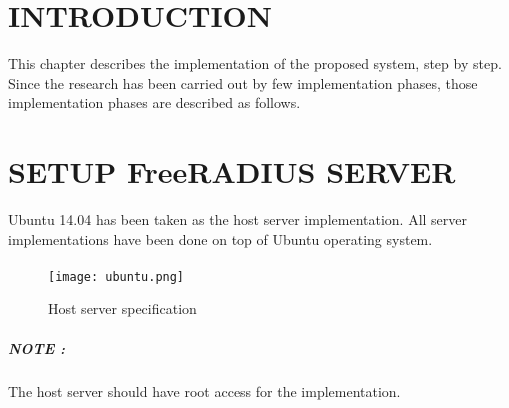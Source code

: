 \section{INTRODUCTION}
This chapter describes the implementation of the proposed system, step by step. Since the research has been carried out by few implementation phases, those implementation phases are described as follows. 

\section{SETUP FreeRADIUS SERVER}
Ubuntu 14.04 has been taken as the host server implementation. All server implementations have been done on top of Ubuntu operating system.

\paragraph{}
\begin{center}
	\begin{figure*}[h]	
		\centering
		\texttt{[image: ubuntu.png]}
		\caption{Host server specification}
	\end{figure*}
\end{center} 

\subparagraph{NOTE : }
The host server should have root access for the implementation.

